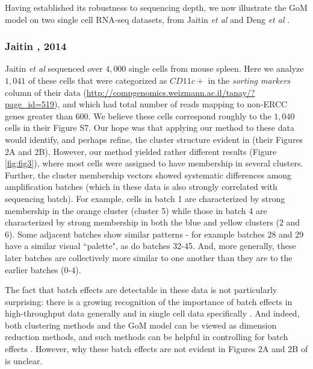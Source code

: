 Having established its robustness to sequencing depth,
we now illustrate the GoM model on two single cell RNA-seq datasets, from Jaitin \textit{et al} \cite{Jaitin2014} and Deng \textit{et al} \cite{Deng2014}.  

\subsubsection{Jaitin , 2014}

Jaitin \textit{et al} sequenced over $4,000$ single cells from mouse spleen. 
Here we analyze $1,041$ of these cells that were categorized as $CD11c+$ in the \textit{sorting markers} column of their data (\url{http://compgenomics.weizmann.ac.il/tanay/?page_id=519}), and which had total number of reads mapping to non-ERCC genes greater than $600$. We believe these cells correspond roughly to the $1,040$ cells in their Figure S7.   Our hope was that applying our method to these data would identify, and perhaps refine, the cluster structure evident in 
\cite{Jaitin2014} (their Figures 2A and 2B). However, our method yielded rather different results (Figure \ref{fig:fig3}), where most cells were assigned to have membership
in several clusters. Further, the cluster membership vectors showed systematic differences among amplification batches (which in these data is also strongly correlated with sequencing batch). For example, cells in batch 1 are characterized by strong membership in the orange cluster (cluster 5) while those in batch 4 are characterized
by strong membership in both the blue and yellow clusters (2 and 6). Some adjacent batches show similar patterns - for example batches 28 and 29 have a similar visual ``palette", as do batches 32-45. And, more generally, these later batches are collectively more similar to one another than they are to the earlier batches (0-4).

The fact that batch effects are detectable in these data is not particularly surprising: there is a growing recognition of the importance of batch effects in high-throughput data generally \cite{Leek2010} and in single cell data specifically \cite{Hicks2015}. And indeed, both clustering methods and the GoM model can be viewed
as dimension reduction methods, and such methods can be helpful in controlling for batch effects \cite{Leek2007} \cite{Stegle2012}. However, why these batch effects are not evident in Figures 2A and 2B of \cite{Jaitin2014} is unclear. 


